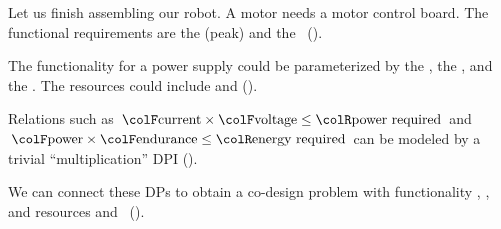 \begin{example}
\label{exa:finish}Let us finish assembling our robot. A motor needs
a motor control board. The functional requirements are the (peak)
 and the ~().


\noindent The functionality for a power supply could be parameterized
by the , the , and the .
The resources could include  and  ().


\noindent 

\noindent Relations such as ${\colF\mbox{current}}\times{\colF\mbox{voltage}}\leq{\colR\mbox{power required}}$
and ${\colF\mbox{power}}\times{\colF\mbox{endurance}}\leq{\colR\mbox{energy required}}$
can be modeled by a trivial ``multiplication'' DPI ().


\noindent We can connect these DPs to obtain a co-design problem with
functionality , ,  and resources
 and ~().


\end{example}
